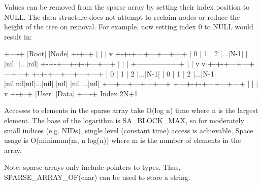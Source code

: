 Values can be removed from the sparse array by setting their index position to NULL. The data structure does not attempt to reclaim nodes or reduce the height of the tree on removal. For example, now setting index 0 to NULL would result in\+: \begin{DoxyVerb}    +----+
    |Root|
    |Node|
    +-+--+
      |
      |
      |
      v
    +-+-+---+---+---+---+
    | 0 | 1 | 2 |...|N-1|
    |   |nil|   |...|nil|
    +-+-+---+-+-+---+---+
      |       |
      |       +------------------+
      |                          |
      v                          v
    +-+-+---+---+---+---+      +-+-+---+---+---+---+
    | 0 | 1 | 2 |...|N-1|      | 0 | 1 | 2 |...|N-1|
    |nil|nil|nil|...|nil|      |nil|   |nil|...|nil|
    +---+---+---+---+---+      +---+-+-+---+---+---+
                                     |
                                     |
                                     |
                                     v
                                   +-+--+
                                   |User|
                                   |Data|
                                   +----+
                              Index 2N+1
\end{DoxyVerb}
 Accesses to elements in the sparse array take O(log n) time where n is the largest element. The base of the logarithm is {\ttfamily SA\+\_\+\+BLOCK\+\_\+\+MAX}, so for moderately small indices (e.\+g. NIDs), single level (constant time) access is achievable. Space usage is O(minimum(m, n log(n)) where m is the number of elements in the array.

Note\+: sparse arrays only include pointers to types. Thus, {\ttfamily SPARSE\+\_\+\+ARRAY\+\_\+\+OF(char)} can be used to store a string. 